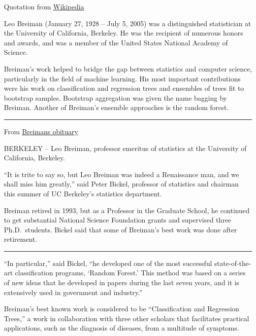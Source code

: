 \documentclass[]{article}
\begin{document}
Quotation from
\href{https://en.wikipedia.org/wiki/Leo_Breiman}{Wikipedia}

Leo Breiman (January 27, 1928 -- July 5, 2005) was a distinguished
statistician at the University of California, Berkeley. He was the
recipient of numerous honors and awards, and was a member of the United
States National Academy of Science.

Breiman's work helped to bridge the gap between statistics and computer
science, particularly in the field of machine learning. His most
important contributions were his work on classification and regression
trees and ensembles of trees fit to bootstrap samples. Bootstrap
aggregation was given the name bagging by Breiman. Another of Breiman's
ensemble approaches is the random forest.

\begin{center}\rule{0.5\linewidth}{\linethickness}\end{center}

From
\href{https://www.berkeley.edu/news/media/releases/2005/07/07_breiman.shtml}{Breimans
obituary}

BERKELEY -- Leo Breiman, professor emeritus of statistics at the
University of California, Berkeley.

``It is trite to say so, but Leo Breiman was indeed a Renaissance man,
and we shall miss him greatly,'' said Peter Bickel, professor of
statistics and chairman this summer of UC Berkeley's statistics
department.

Breiman retired in 1993, but as a Professor in the Graduate School, he
continued to get substantial National Science Foundation grants and
supervised three Ph.D.~students. Bickel said that some of Breiman's best
work was done after retirement.

\begin{center}\rule{0.5\linewidth}{\linethickness}\end{center}

``In particular,'' said Bickel, ``he developed one of the most
successful state-of-the-art classification programs, `Random Forest.'
This method was based on a series of new ideas that he developed in
papers during the last seven years, and it is extensively used in
government and industry.''

Breiman's best known work is considered to be ``Classification and
Regression Trees,'' a work in collaboration with three other scholars
that facilitates practical applications, such as the diagnosis of
diseases, from a multitude of symptoms.
\end{document}
